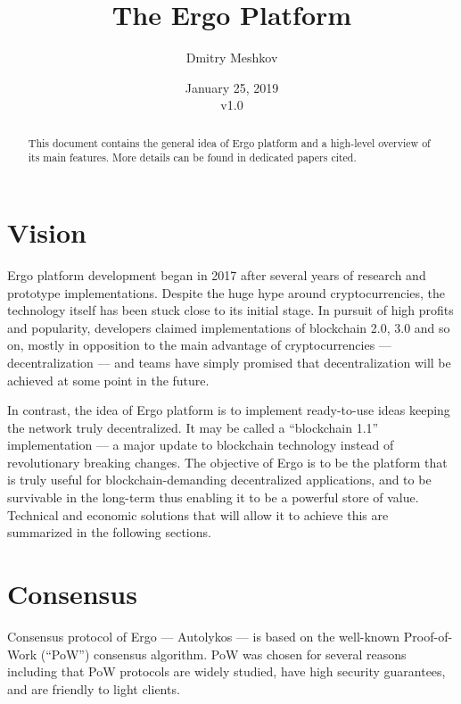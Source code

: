 \documentclass[]{article}
\begin{document}
    \title{The Ergo Platform}
    \author{Dmitry Meshkov}

    \date{January 25, 2019\\v1.0}

    \maketitle

    \begin{abstract}
        This document contains the general idea of Ergo platform and a high-level overview of its main
        features. More details can be found in dedicated papers cited.
    \end{abstract}

    \section{Vision}

    Ergo platform development began in 2017 after several years of research and prototype
    implementations. Despite the huge hype around cryptocurrencies, the technology itself has
    been stuck close to its initial stage. In pursuit of high profits and popularity, developers claimed
    implementations of blockchain 2.0, 3.0 and so on, mostly in opposition to the main advantage of
    cryptocurrencies --- decentralization --- and teams have simply promised that decentralization will
    be achieved at some point in the future.

    In contrast, the idea of Ergo platform is to implement ready-to-use ideas keeping the network
    truly decentralized. It may be called a ``blockchain 1.1'' implementation --- a major update to
    blockchain technology instead of revolutionary breaking changes. The objective of Ergo is to be
    the platform that is truly useful for blockchain-demanding decentralized applications, and to be
    survivable in the long-term thus enabling it to be a powerful store of value. Technical and economic
    solutions that will allow it to achieve this are summarized in the following sections.

    \section{Consensus}

    Consensus protocol of Ergo --- Autolykos --- is based on the well-known
    Proof-of-Work (``PoW'')
    consensus algorithm. PoW was chosen for several reasons including that PoW protocols are widely
    studied, have high security guarantees, and are friendly to light clients.
\end{document}
